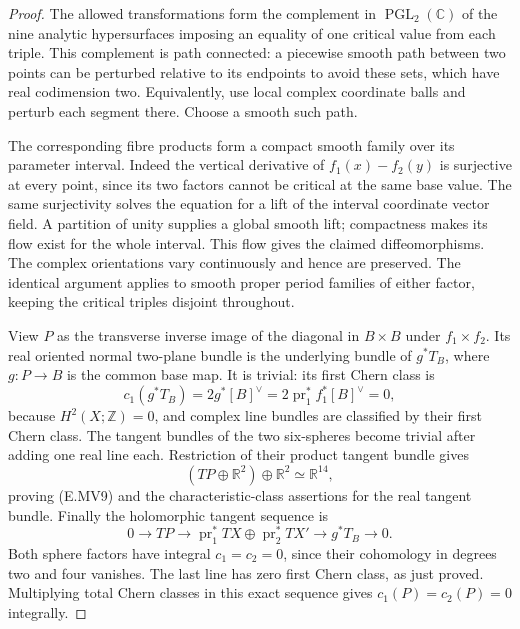 \begin{proof}
The allowed transformations form the complement in
$\operatorname{PGL}_2(\mathbb C)$ of the nine analytic
hypersurfaces imposing an equality of one critical value from
each triple. This complement is path connected: a piecewise
smooth path between two points can be perturbed relative to
its endpoints to avoid these sets, which have real codimension
two. Equivalently, use local complex coordinate balls and
perturb each segment there. Choose a smooth such path.

The corresponding fibre products form a compact smooth family
over its parameter interval. Indeed the vertical derivative of
$f_1(x)-f_2(y)$ is surjective at every point, since its two
factors cannot be critical at the same base value. The same
surjectivity solves the equation for a lift of the interval
coordinate vector field. A partition of unity supplies a
global smooth lift; compactness makes its flow exist for the
whole interval. This flow gives the claimed diffeomorphisms.
The complex orientations vary continuously and hence are
preserved. The identical argument applies to smooth proper
period families of either factor, keeping the critical triples
disjoint throughout.

View $P$ as the transverse inverse image of the diagonal in
$B\times B$ under $f_1\times f_2$. Its real oriented normal
two-plane bundle is the underlying bundle of $g^*T_B$,
where $g:P\to B$ is the common base map. It is trivial:
its first Chern class is
\[
 c_1(g^*T_B)=2g^*[B]^\vee
    =2\operatorname{pr}_1^*f_1^*[B]^\vee=0,
\]
because $H^2(X;\mathbb Z)=0$, and complex line bundles are
classified by their first Chern class. The tangent bundles
of the two six-spheres become trivial after adding one real
line each. Restriction of their product tangent bundle gives
\[
 (TP\oplus\mathbb R^2)\oplus\mathbb R^2
       \simeq\mathbb R^{14},
\]
proving (E.MV9) and the characteristic-class assertions for
the real tangent bundle. Finally the holomorphic tangent
sequence is
\[
 0\longrightarrow TP\longrightarrow
 \operatorname{pr}_1^*TX\oplus\operatorname{pr}_2^*TX'
 \longrightarrow g^*T_B\longrightarrow0.
\]
Both sphere factors have integral $c_1=c_2=0$, since their
cohomology in degrees two and four vanishes. The last line
has zero first Chern class, as just proved. Multiplying total
Chern classes in this exact sequence gives
$c_1(P)=c_2(P)=0$ integrally.
\end{proof}
